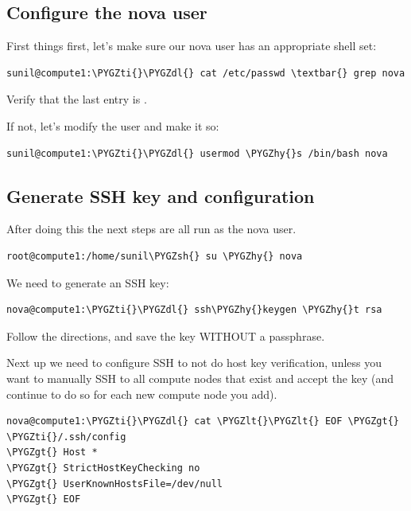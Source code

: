\documentclass[letterpaper,10pt,english]{sphinxmanual}
\def\PYGZlt{\char`\<}
\def\PYGZgt{\char`\>}
\def\PYGZsh{\char`\#}
\def\PYGZdl{\char`\$}
\def\PYGZhy{\char`\-}
\def\PYGZti{\char`\~}
\begin{document}
\subsection{Configure the nova user}
\label{_source/installation_guide/vm_resize:configure-the-nova-user}
First things first, let's make sure our nova user has an appropriate shell set:

\begin{Verbatim}[commandchars=\\\{\}]
sunil@compute1:\PYGZti{}\PYGZdl{} cat /etc/passwd \textbar{} grep nova
\end{Verbatim}

Verify that the last entry is .

If not, let's modify the user and make it so:

\begin{Verbatim}[commandchars=\\\{\}]
sunil@compute1:\PYGZti{}\PYGZdl{} usermod \PYGZhy{}s /bin/bash nova
\end{Verbatim}


\subsection{Generate SSH key and configuration}
\label{_source/installation_guide/vm_resize:generate-ssh-key-and-configuration}
After doing this the next steps are all run as the nova user.

\begin{Verbatim}[commandchars=\\\{\}]
root@compute1:/home/sunil\PYGZsh{} su \PYGZhy{} nova
\end{Verbatim}

We need to generate an SSH key:

\begin{Verbatim}[commandchars=\\\{\}]
nova@compute1:\PYGZti{}\PYGZdl{} ssh\PYGZhy{}keygen \PYGZhy{}t rsa
\end{Verbatim}

Follow the directions, and save the key WITHOUT a passphrase.

Next up we need to configure SSH to not do host key verification, unless you want to manually SSH to all compute nodes that exist and accept the key (and continue to do so for each new compute node you add).

\begin{Verbatim}[commandchars=\\\{\}]
nova@compute1:\PYGZti{}\PYGZdl{} cat \PYGZlt{}\PYGZlt{} EOF \PYGZgt{} \PYGZti{}/.ssh/config
\PYGZgt{} Host *
\PYGZgt{} StrictHostKeyChecking no
\PYGZgt{} UserKnownHostsFile=/dev/null
\PYGZgt{} EOF
\end{Verbatim}
\end{document}
